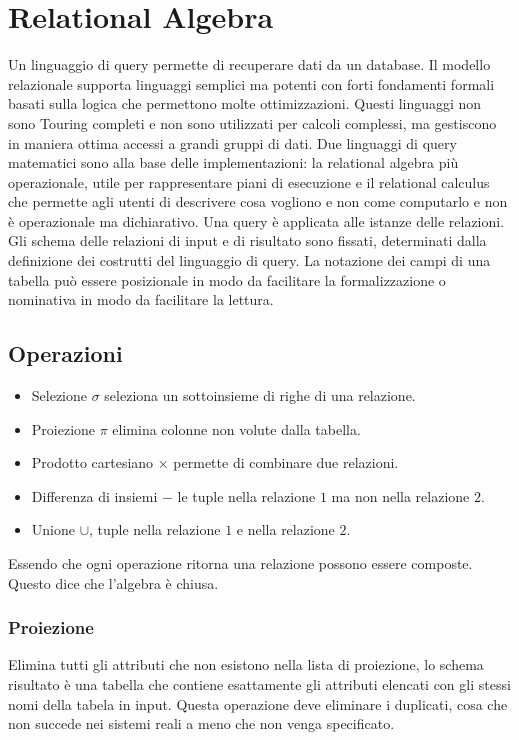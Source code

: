 \chapter{Relational Algebra}
Un linguaggio di query permette di recuperare dati da un database. Il modello relazionale supporta linguaggi semplici ma potenti con forti fondamenti formali
basati sulla logica che permettono molte ottimizzazioni. Questi linguaggi non sono Touring completi e non sono utilizzati per calcoli complessi, ma 
gestiscono in maniera ottima accessi a grandi gruppi di dati. Due linguaggi di query matematici sono alla base delle implementazioni: la relational algebra
pi\`u operazionale, utile per rappresentare piani di esecuzione e il relational calculus che permette agli utenti di descrivere cosa vogliono e non come
computarlo e non \`e operazionale ma dichiarativo. Una query \`e applicata alle istanze delle relazioni. Gli schema delle relazioni di input e di risultato 
sono fissati, determinati dalla definizione dei costrutti del linguaggio di query. La notazione dei campi di una tabella pu\`o essere posizionale in modo 
da facilitare la formalizzazione o nominativa in modo da facilitare la lettura. 
\section{Operazioni}
\begin{itemize}
\item Selezione $\sigma$ seleziona un sottoinsieme di righe di una relazione.
\item Proiezione $\pi$ elimina colonne non volute dalla tabella.
\item Prodotto cartesiano $\times$ permette di combinare due relazioni.
\item Differenza di insiemi $-$ le tuple nella relazione $1$ ma non nella relazione $2$.
\item Unione $\cup$, tuple nella relazione $1$ e nella relazione $2$.
\end{itemize}
Essendo che ogni operazione ritorna una relazione possono essere composte. Questo dice che l'algebra \`e chiusa. 
\subsection{Proiezione}
Elimina tutti gli attributi che non esistono nella lista di proiezione, lo schema risultato \`e una tabella che contiene esattamente gli attributi elencati
con gli stessi nomi della tabela in input. Questa operazione deve eliminare i duplicati, cosa che non succede nei sistemi reali a meno che non venga 
specificato. 
